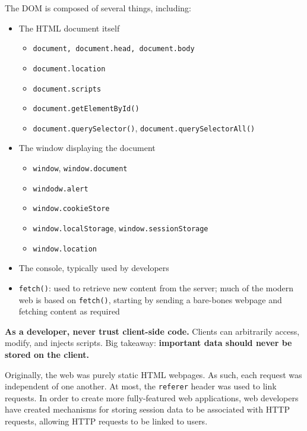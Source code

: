 The DOM is composed of several things, including:
\begin{itemize}[noitemsep]
    \item The HTML document itself
    \begin{itemize}[noitemsep]
        \item \texttt{document, document.head, document.body}
        \item \texttt{document.location}
        \item \texttt{document.scripts}
        \item \texttt{document.getElementById()}
        \item \texttt{document.querySelector()}, \texttt{document.querySelectorAll()}
    \end{itemize}
    \item The window displaying the document
    \begin{itemize}[noitemsep]
        \item \texttt{window}, \texttt{window.document}
        \item \texttt{windodw.alert}
        \item \texttt{window.cookieStore}
        \item \texttt{window.localStorage}, \texttt{window.sessionStorage}
        \item \texttt{window.location}
    \end{itemize}
    \item The console, typically used by developers
    \item \texttt{fetch()}: used to retrieve new content from the server; much of the modern web is based on \texttt{fetch()}, starting by sending a bare-bones webpage and fetching content as required
\end{itemize}

\begin{notebox}
    \textbf{As a developer, never trust client-side code.} Clients can arbitrarily access, modify, and injects scripts. Big takeaway: \textbf{important data should never be stored on the client.}
\end{notebox}

Originally, the web was purely static HTML webpages. As such, each request was independent of one another. At most, the \texttt{referer} header was used to link requests. In order to create more fully-featured web applications, web developers have created mechanisms for storing session data to be associated with HTTP requests, allowing HTTP requests to be linked to users.

